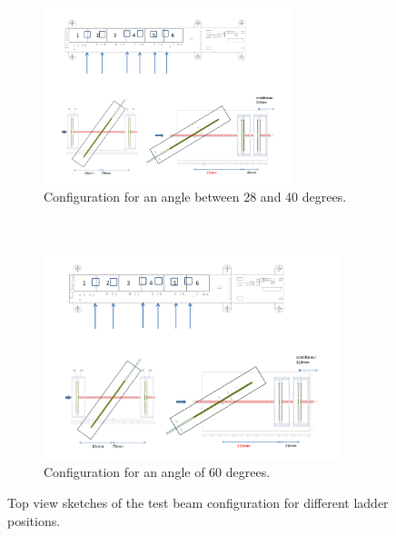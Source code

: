 \begin{figure}[!h]
      \begin{subfigure}[t]{0.45\textwidth}
        \centering
        \includegraphics[width=0.8\textwidth]{Pictures/deformation/tb_cern_11_sketch_tilted.pdf}
        \caption{Configuration for an angle between 28 and 40 degrees.}
        \label{fig:tilt36}
      \end{subfigure}
      ~%
      \begin{subfigure}[t]{0.45\textwidth}
        \centering
        \includegraphics[width=0.95\textwidth]{Pictures/deformation/tb_cern_11_sketch_tilted120mm.pdf}
        \caption{Configuration for an angle of 60 degrees.}
        \label{fig:tilt60}
      \end{subfigure}
      \caption{Top view sketches of the test beam configuration for different ladder positions.}
      \label{fig:tilt}
    \end{figure}   

